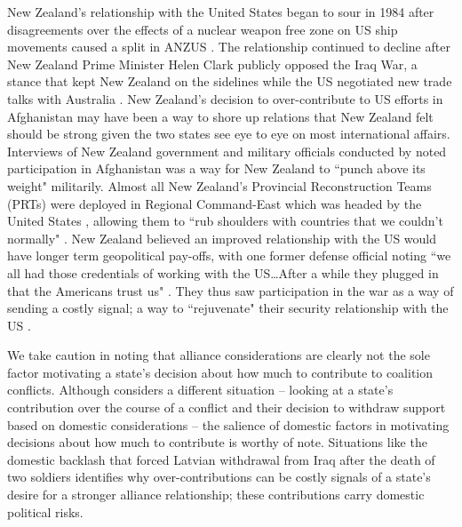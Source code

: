 \documentclass[12pt,letterpaper]{article}
\begin{document}
		New Zealand's relationship with the United States began to sour in 1984 after disagreements over the effects of a nuclear weapon free zone on US ship movements caused a split in ANZUS \citep{catalinac_whynewzealand_2010}. The relationship continued to decline after New Zealand Prime Minister Helen Clark publicly opposed the Iraq War, a stance that kept New Zealand on the sidelines while the US negotiated new trade talks with Australia \citep{armstrong_alliesrewardedtrade_2003}. New Zealand's decision to over-contribute to US efforts in Afghanistan may have been a way to shore up relations that New Zealand felt should be strong given the two states see eye to eye on most international affairs. Interviews of New Zealand government and military officials conducted by \citet{wellings_narrativealignmentmisalignment_2018} noted participation in Afghanistan was a way for New Zealand to ``punch above its weight" militarily. Almost all New Zealand's Provincial Reconstruction Teams (PRTs) were deployed in Regional Command-East which was headed by the United States \citep[49]{auerswald_natoafghanistanfighting_2014}, allowing them to ``rub shoulders with countries that we couldn't normally" \citep{wellings_narrativealignmentmisalignment_2018}. New Zealand believed an improved relationship with the US would have longer term geopolitical pay-offs, with one former defense official noting ``we all had those credentials of working with the US\ldots After a while they plugged in that the Americans trust us" \citep[31]{wellings_narrativealignmentmisalignment_2018}. They thus saw participation in the war as a way of sending a costly signal; a way to ``rejuvenate" their security relationship with the US \citep[128]{burton_natodurabilitypostcold_2018}.
		
		We take caution in noting that alliance considerations are clearly not the sole factor motivating a state's decision about how much to contribute to coalition conflicts. Although \citet{mello_pathscoalitiondefection_2020} considers a different situation -- looking at a state's contribution over the course of a conflict and their decision to withdraw support based on domestic considerations -- the salience of domestic factors in motivating decisions about how much to contribute is worthy of note. Situations like the domestic backlash that forced Latvian withdrawal from Iraq after the death of two soldiers identifies why over-contributions can be costly signals of a state's desire for a stronger alliance relationship; these contributions carry domestic political risks.
\end{document}
